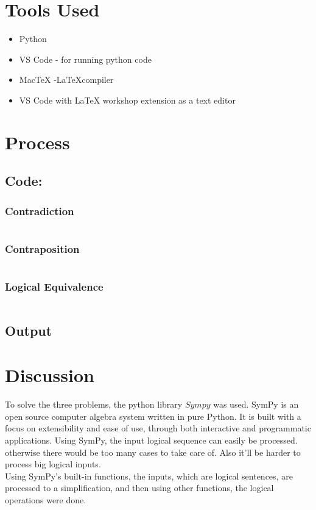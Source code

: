 \documentclass[12pt]{article}
\begin{document}
\section{Tools Used}
\begin{itemize}
    \item Python
    \item VS Code - for running python code
    \item MacTeX -\LaTeX  compiler
    \item VS Code with LaTeX workshop extension as a text editor
\end{itemize}

\section{Process}

\subsection{Code:}
\subsubsection{Contradiction}
\inputminted[breaklines,linenos]{python3}{codes/lr4_contradiction.py}

\subsubsection{Contraposition}
\inputminted[breaklines,linenos]{python3}{codes/lr4_contraposition.py}

\subsubsection{Logical Equivalence}
\inputminted[breaklines,linenos]{python3}{codes/lr4_equivalance.py}

\subsection{Output}



\section{Discussion}
To solve the three problems, the python library $Sympy$ was used. SymPy is an open source computer algebra system written in pure Python. It is built with a focus on extensibility and ease of use, through both interactive and programmatic applications.\cite{grangersympy} Using SymPy, the input logical sequence can easily be processed. otherwise there would be too many cases to take care of. Also it'll be harder to process big logical inputs.\\
Using SymPy's built-in functions, the inputs, which are logical sentences, are processed to a simplification, and then using other functions, the logical operations were done.




\end{document}
